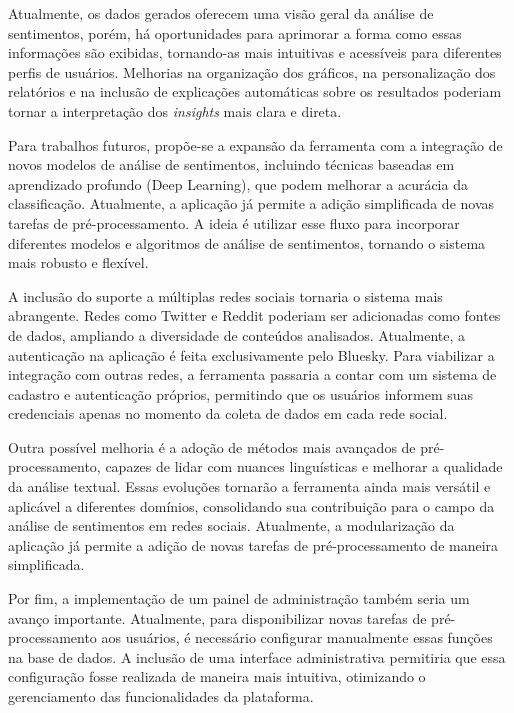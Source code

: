 \documentclass[
	12pt,				%
	oneside,			%
	a4paper,			%
	english,			%
	french,				%
	spanish,			%
	brazil				%
	]{abntex2}
\begin{document}
Atualmente, os dados gerados oferecem uma visão geral da análise de
sentimentos, porém, há oportunidades para aprimorar a forma como essas
informações são exibidas, tornando-as mais intuitivas e acessíveis para
diferentes perfis de usuários. Melhorias na organização dos gráficos, na
personalização dos relatórios e na inclusão de explicações automáticas
sobre os resultados poderiam tornar a interpretação dos \emph{insights}
mais clara e direta.

Para trabalhos futuros, propõe-se a expansão da ferramenta com a
integração de novos modelos de análise de sentimentos, incluindo
técnicas baseadas em aprendizado profundo (Deep Learning), que podem
melhorar a acurácia da classificação. Atualmente, a aplicação já permite
a adição simplificada de novas tarefas de pré-processamento. A ideia é
utilizar esse fluxo para incorporar diferentes modelos e algoritmos de
análise de sentimentos, tornando o sistema mais robusto e flexível.

A inclusão do suporte a múltiplas redes sociais tornaria o sistema mais
abrangente. Redes como Twitter e Reddit poderiam ser adicionadas como
fontes de dados, ampliando a diversidade de conteúdos analisados.
Atualmente, a autenticação na aplicação é feita exclusivamente pelo
Bluesky. Para viabilizar a integração com outras redes, a ferramenta
passaria a contar com um sistema de cadastro e autenticação próprios,
permitindo que os usuários informem suas credenciais apenas no momento
da coleta de dados em cada rede social.

Outra possível melhoria é a adoção de métodos mais avançados de
pré-processamento, capazes de lidar com nuances linguísticas e melhorar
a qualidade da análise textual. Essas evoluções tornarão a ferramenta
ainda mais versátil e aplicável a diferentes domínios, consolidando sua
contribuição para o campo da análise de sentimentos em redes sociais.
Atualmente, a modularização da aplicação já permite a adição de novas
tarefas de pré-processamento de maneira simplificada.

Por fim, a implementação de um painel de administração também seria um
avanço importante. Atualmente, para disponibilizar novas tarefas de
pré-processamento aos usuários, é necessário configurar manualmente
essas funções na base de dados. A inclusão de uma interface
administrativa permitiria que essa configuração fosse realizada de
maneira mais intuitiva, otimizando o gerenciamento das funcionalidades
da plataforma.

\postextual
\end{document}
